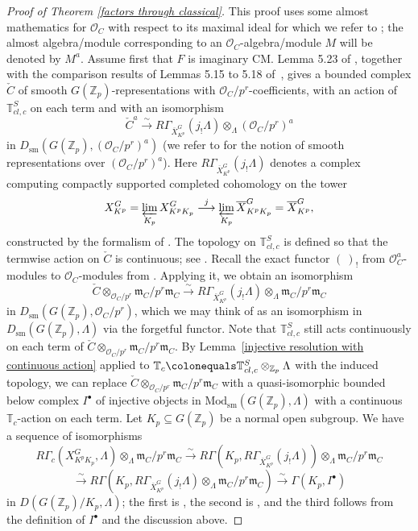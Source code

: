 \documentclass{amsart}
\theoremstyle{remark}
\numberwithin{equation}{subsection}
\newcommand{\Z}{\ZZ}
\newcommand{\m}{\frakm}
\newcommand{\TT}{{\mathbb T}}
\newcommand{\ZZ}{{\mathbb Z}}
\newcommand{\cO}{{\mathcal O}}
\newcommand{\frakm}{\mathfrak{m}}
\newcommand{\toisom}{\xrightarrow{\sim}}
\newcommand{\ol}{\overline}
\newcommand{\defeq}{\colonequals}
\renewcommand{\(}{\left(}
\renewcommand{\)}{\right)}
\begin{document}
\begin{proof}[Proof of Theorem \ref{factors through classical}] This proof uses some almost mathematics for $\cO_C$ with respect to its maximal ideal for which we refer to \cite{gabber-ramero}; the almost algebra/module corresponding to an $\cO_C$-algebra/module $M$ will be denoted by $M^a$. Assume first that $F$ is imaginary CM. Lemma 5.23 of \cite{newton-thorne}, together with the comparison results of Lemmas 5.15 to 5.18 of~\cite{newton-thorne}, gives a bounded complex $\check{C}$ of smooth $G(\Z_p)$-representations with $\cO_C/p^r$-coefficients, with an action of $\mathbb{T}^S_{cl,c}$ on each term and with an isomorphism
\[
\check{C}^a   \toisom R\Gamma_{\ol{X}_{K^p}^G}(j_! \Lambda) \otimes_{\Lambda} (\cO_C/p^r)^a
\]
in $D_{\mathrm{sm}}(G(\Z_p),(\cO_C/p^r)^a)$ (we refer to \cite[\S 2.6]{newton-thorne} for the notion of smooth representations over $(\cO_C/p^r)^a$). Here $R\Gamma_{\ol{X}_{K^p}^G}(j_!\Lambda)$ denotes a complex computing compactly supported completed cohomology on the tower
\[ 
X_{K^p}^G = \varprojlim_{K_p}X_{K^p K_p}^G \overset{j}{\longrightarrow} \varprojlim_{K_p}\ol{X}_{K^p K_p}^G = \ol{X}_{K^p}^G ,
\]
constructed by the formalism of \cite[\S 2.5]{newton-thorne}. The topology on $\TT^S_{cl,c}$ is defined so that the termwise action on $\check{C}$ is continuous; see \cite[Proof of Theorem 4.3.1]{scholze-galois}. Recall the exact functor $(\ )_{!}$ from $\cO_{C}^{a}$-modules to $\cO_{C}$-modules from \cite[\S 2.2.21]{gabber-ramero}. Applying it, we obtain an isomorphism
\[
\check{C}\otimes_{\cO_C/p^r}\m_C/p^r\m_C \toisom R\Gamma_{\ol{X}_{K^p}^G}(j_! \Lambda) \otimes_{\Lambda} \m_C/p^r \m_C
\]
in $D_{\mathrm{sm}}(G(\Z_p),\cO_C/p^r)$, which we may think of as an isomorphism in $D_{\mathrm{sm}}(G(\Z_p), \Lambda)$
via the forgetful functor.  Note that $\mathbb{T}^S_{cl,c}$ still acts continuously on each term of $\check{C}\otimes_{\cO_C/p^r}\m_C/p^r\m_C$. By Lemma~\ref{injective resolution with continuous action} applied to $\mathbb{T}_c\defeq \mathbb{T}^S_{cl,c}\otimes_{\Z_p}\Lambda$ with the induced topology, we can replace $\check{C}\otimes_{\cO_C/p^r}\m_C/p^r\m_C$ with a quasi-isomorphic bounded below complex $I^\bullet$ of injective objects in $\mathrm{Mod}_{\mathrm{sm}}(G(\Z_p), \Lambda)$ with a continuous $\mathbb{T}_c$-action on each term. Let $K_p\subseteq G(\Z_p)$ be a normal open subgroup. We have a sequence of isomorphisms
\[
R\Gamma_c(X_{K^p K_p}^G,\Lambda) \otimes_{\Lambda}\m_C/p^r\m_C\toisom R\Gamma\left(K_p, R\Gamma_{\ol{X}_{K^p}^G}(j_! \Lambda)\right)\otimes_{\Lambda}\m_C/p^r\m_C
\]
\[
\toisom R\Gamma\left(K_p, R\Gamma_{\ol{X}_{K^p}^G}(j_! \Lambda)\otimes_{\Lambda}\m_C/p^r\m_C \right) \toisom \Gamma(K_p,I^\bullet)
\]
in $D(G(\Z_p)/K_p, \Lambda)$; the first is \cite[Lemma 2.39]{newton-thorne}, the second is \cite[Lemma 2.38]{newton-thorne}, and the third follows from the definition of $I^\bullet$ and the discussion above. 


\end{proof}
\end{document}
